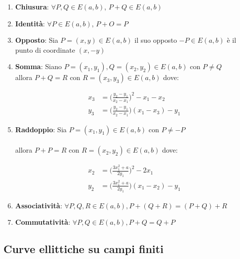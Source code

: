 \documentclass{article}
\begin{document}
	\begin{enumerate}
		\item \textbf{Chiusura}: $\forall P, Q \in E(a,b)$, $P+Q \in E(a,b)$
		
		\item \textbf{Identità}: $\forall P \in E(a,b)$, $P + O = P$
		
		\item \textbf{Opposto}: Sia $P = (x,y) \in E(a,b)$ il suo opposto $-P \in E(a,b)$ è il punto di coordinate $(x, -y)$
		
		\item \textbf{Somma}: Siano $P = (x_{1}, y_{1}), Q = (x_{2}, y_{2}) \in E(a,b)$ con $P \neq Q$ 
		\\ allora $P + Q = R$ con $R = (x_{3}, y_{3}) \in E(a,b)$ dove:
		
		\begin{equation}
		\begin{aligned}
		x_{3} & = \Big (\frac{y_{2} - y_{1}}{x_{2} - x_{1}} \Big )^{2} - x_{1} - x_{2}   \\
		y_{3} & = \Big (\frac{y_{2} - y_{1}}{x_{2} - x_{1}} \Big )(x_{1} - x_{3})-y_{1} 
		\end{aligned}
		\end{equation}
		
		\item \textbf{Raddoppio}: Sia $P = (x_{1},y_{1}) \in E(a,b)$ con $P \neq -P$ \\
		\\allora $P + P = R$ con $R = (x_{2}, y_{2}) \in E(a,b)$ dove:
		
		\begin{equation}
		\begin{aligned}
		x_{2} & = \Big (\frac{3x_{1}^{2}+a}{2y_{1}} \Big )^{2} - 2x_{1}  \\          
		y_{2} & = \Big (\frac{3x_{1}^{2}+a}{2y_{1}} \Big ) (x_{1}-x_{2})-y_{1} 
		\end{aligned}
		\end{equation}
		
		\item \textbf{Associatività}: $\forall P, Q, R \in E(a,b), P+(Q+R) = (P+Q)+R$
		
		\item \textbf{Commutatività}: $\forall P, Q \in E(a,b), P+Q = Q+P$
		
	\end{enumerate}
	
	\subsection{Curve ellittiche su campi finiti}
	
\end{document}
